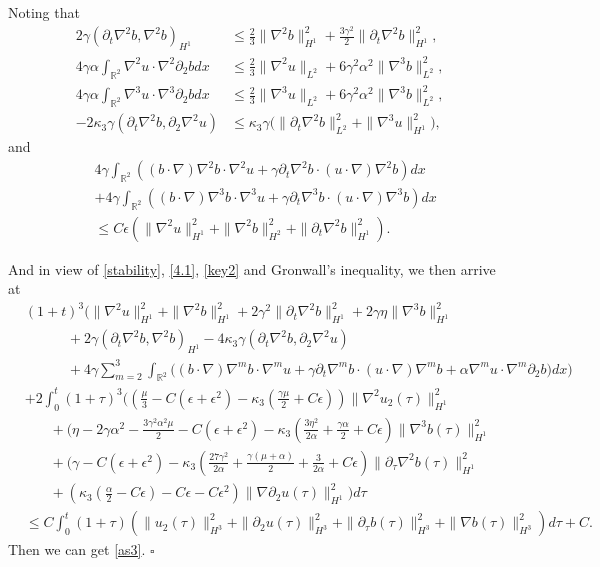 \documentclass[reqno,11pt]{amsart}
\def\R{\mathbb R}
\numberwithin{Thm}{section}
\begin{document}
Noting that
\begin{align*}
2\gamma(\partial_t\nabla^2 b,\nabla^2 b)_{H^1}
&\leq \frac{2}{3}\|\nabla^2 b\|_{H^1}^2+\frac{3\gamma^2}{2}\|\partial_t\nabla^2 b\|_{H^1}^2,\\
4\gamma\alpha\int_{\R^2}\nabla^2u\cdot\nabla^2\partial_2bdx
&\leq \frac{2}{3}\|\nabla^2 u\|_{L^2}+6\gamma^2\alpha^2\|\nabla^3 b\|_{L^2}^2,\\
4\gamma\alpha\int_{\R^2}\nabla^3u\cdot\nabla^3\partial_2bdx
&\leq \frac{2}{3}\|\nabla^3 u\|_{L^2}+6\gamma^2\alpha^2\|\nabla^3 b\|_{L^2}^2,\\
-2\kappa_3\gamma(\partial_t\nabla^2 b,\partial_2\nabla^2 u)&\leq \kappa_3\gamma\big(\|\partial_t\nabla^2 b\|_{L^2}^2+\|\nabla^3 u\|_{H^1}^2\big),
\end{align*}
and
 \begin{align*}
&4\gamma\int_{\R^2}\left((b\cdot\nabla)\nabla^2 b\cdot\nabla^2 u+\gamma\partial_{t}\nabla^2b\cdot (u\cdot\nabla)\nabla^2 b\right)dx\nonumber\\
&+4\gamma\int_{\R^2}\left((b\cdot\nabla)\nabla^3 b\cdot\nabla^3 u+\gamma\partial_{t}\nabla^3b\cdot (u\cdot\nabla)\nabla^3b\right)dx\nonumber\\
&\leq C\epsilon(\|\nabla^2 u\|_{H^1}^2+\|\nabla^2 b\|_{H^2}^2+\|\partial_t\nabla^2 b\|_{H^1}^2).
\end{align*}



And in view of \eqref{stability}, \eqref{4.1}, \eqref{key2} and Gronwall's inequality, we then arrive at
\begin{align*}
&(1+t)^3\Big(\|\nabla^2 u\|^2_{H^1}+\|\nabla^2 b\|^2_{H^1}+2\gamma^2\|\partial_t\nabla^2 b\|^2_{H^1}
+2\gamma\eta\|\nabla^3 b\|^2_{H^1}\nonumber\\
&\qquad\quad+2\gamma(\partial_t\nabla^2 b,\nabla^2 b)_{H^1}-4\kappa_3\gamma(\partial_t\nabla^2 b,\partial_2\nabla^2 u)\nonumber\\
&\qquad\quad+4\gamma\sum_{m=2}^3\int_{\R^2}\big((b\cdot\nabla)\nabla^m b\cdot\nabla^m u+\gamma\partial_{t}\nabla^mb\cdot (u\cdot\nabla)\nabla^m b+\alpha\nabla^mu\cdot\nabla^m\partial_2 b\big)dx\Big)\nonumber\\
&+2\int_{0}^{t}(1+\tau)^3\big((\frac{\mu}{3}-C(\epsilon+\epsilon^2)-\kappa_3(\frac{\gamma\mu}{2}+C\epsilon))\|\nabla^2 u_2(\tau)\|^2_{H^1}\nonumber\\
&\ \ \ \ \ \ \ \ +(\eta-2\gamma\alpha^2-\frac{3\gamma^2\alpha^2\mu}{2}-C(\epsilon+\epsilon^2)-\kappa_3(\frac{3\eta^2}{2\alpha}+\frac{\gamma\alpha}{2}+C\epsilon)\|\nabla ^3b(\tau)\|^2_{H^1}\nonumber\\
&\ \ \ \ \ \ \ \ +(\gamma-C(\epsilon+\epsilon^2)-\kappa_3(\frac{27\gamma^2}{2\alpha}+\frac{\gamma(\mu+\alpha)}{2}+\frac{3}{2\alpha}+C\epsilon)\|\partial_{\tau}\nabla^2 b(\tau)\|^2_{H^1}\nonumber\\
&
\ \ \ \ \ \ \ \ +(\kappa_3(\frac{\alpha}{2}-C\epsilon)-C\epsilon-C\epsilon^2)\|\nabla \partial_2u(\tau)\|_{H^1}^2\big)d\tau\nonumber\\
&\leq C\int_{0}^{t}(1+\tau)\left(\| u_2(\tau)\|^2_{H^3}+\|\partial_2 u(\tau)\|^2_{H^3}+\|\partial_{\tau} b(\tau)\|^2_{H^3}
+\|\nabla b(\tau)\|^2_{H^3}\right)d\tau+C.
\end{align*}
Then we can get \eqref{as3}.
\hfill$\square$
\end{document}
